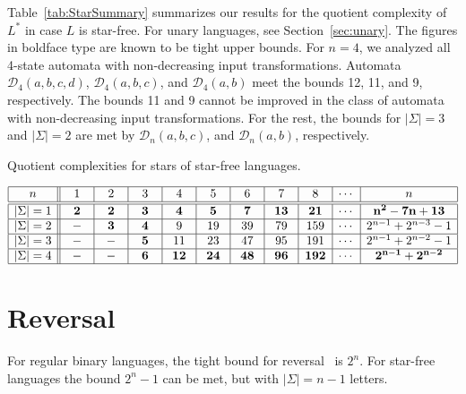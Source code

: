 \documentclass{llncs}
\newcommand{\Sig}{\Sigma}
\newcommand{\cD}{{\mathcal D}}
\begin{document}
Table~\ref{tab:StarSummary} summarizes our results for the quotient complexity of $L^*$ in case $L$ is star-free. For unary languages, see Section~\ref{sec:unary}. The figures in boldface type are known to be tight upper bounds. 
For $n=4$, we analyzed all 4-state automata with non-decreasing input transformations.
Automata $\cD_{4}(a,b,c,d)$,  $\cD_{4}(a,b,c)$, and $\cD_{4}(a,b)$ meet the bounds 12,
11, and 9, respectively.
The bounds 11 and 9 cannot be improved in the class of automata with non-decreasing input transformations.
For the rest, the bounds for $|\Sig|=3$ and $|\Sig|=2$ are met by 
$\cD_{n}(a,b,c)$, and $\cD_{n}(a,b)$, respectively.

\setlength{\extrarowheight}{2pt}
\begin{table}[ht]
\caption{Quotient  complexities for stars of star-free languages.}
\label{tab:StarSummary}
\begin{center}
$
\begin{array}{| c ||c|c| c| c|c|c|c|c|c|c|}    
\hline
\ \ n \ \ &\ \ 1 \ \ &\ \ 2 \ \ &\ \ 3 \  \ & \  \  4 \ \ 
& \ \ 5 \ \  &\ \ 6 \ \  & \ \ 7 \ \ &\  \ 8 \  \ & \cdots 
&\  n \  
  \\
\hline  \hline
  |\Sig|=1
&\bf  2 & \bf 2  & \bf 3 & \bf 4	& \bf 5 & \bf   7	&\bf 13  &\bf 21   & \cdots &\ \bf n^2-7n+13 \ \\
\hline
|\Sig|=2 
& - &\bf 3  & \bf 4  &   9	&  19 & 39  & 79  &159   & \cdots & 2^{n-1}+2^{n-3}-1\\
\hline
|\Sig|=3
& - & -& \bf 5 &  11	& 23 & 47 & 95  &191   &\cdots  	&2^{n-1}+2^{n-2}-1  \\
\hline
|\Sig|=4
& - &-  & \bf 6 &\bf 12	& \bf 24 &  \bf 48  &\bf 96  &\bf 192  & \cdots	&\bf 2^{n-1}+2^{n-2} \\
\hline
\end{array}
$
\end{center}
\end{table}



\section{Reversal}
\label{sec:reversal}
For regular binary languages, the tight bound for reversal~\cite{Lei81}  is $2^n$. For star-free languages the bound  $2^n-1$ can be met, but with $|\Sig|=n-1$ letters.
\end{document}
